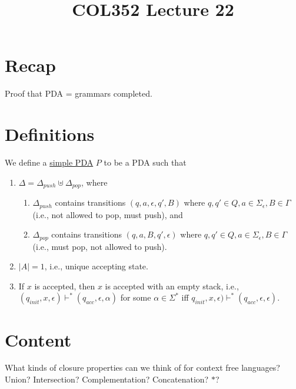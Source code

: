 \documentclass[a4paper]{article}
\title{\textbf{COL352 Lecture 22}}
\date{}
\newcommand{\changesto}{\vdash}
\begin{document}
\maketitle
\tableofcontents

\section{Recap}

Proof that PDA = grammars completed.

\section{Definitions}

\begin{defn}
We define a \underline{simple PDA} $P$ to be a PDA such that
\begin{enumerate}
    \item $\Delta = \Delta_{push} \uplus \Delta_{pop}$, where
        \begin{enumerate}
            \item $\Delta_{push}$ contains transitions $(q, a, \epsilon, q', B)$ where $q, q' \in Q, a \in \Sigma_\epsilon, B \in \Gamma$ (i.e., not allowed to pop, must push), and
            \item $\Delta_{pop}$ contains transitions $(q, a, B, q', \epsilon)$ where $q, q' \in Q, a \in \Sigma_\epsilon, B \in \Gamma$ (i.e., must pop, not allowed to push).
        \end{enumerate}
        \item $|A| = 1$, i.e., unique accepting state.
        \item If $x$ is accepted, then $x$ is accepted with an empty stack, i.e., $(q_{init}, x, \epsilon) \changesto^* (q_{acc}, \epsilon, \alpha)$ for some $\alpha \in \Sigma^*$ iff $q_{init},
            x, \epsilon) \changesto^* (q_{acc}, \epsilon, \epsilon)$.
\end{enumerate}
\end{defn}

\section{Content}

\begin{ques}
    What kinds of closure properties can we think of for context free languages? Union? Intersection? Complementation? Concatenation? $*$?
\end{ques}
\end{document}
